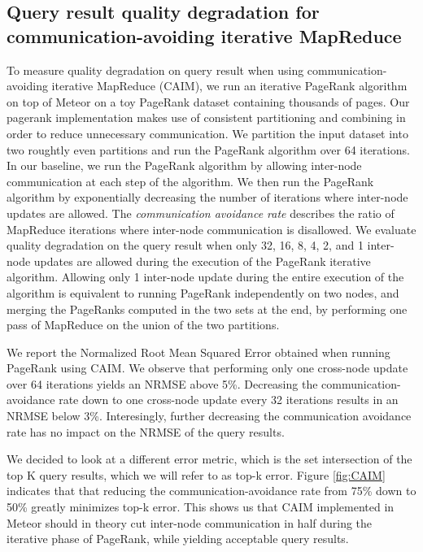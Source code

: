 \subsection{Query result quality degradation for communication-avoiding iterative MapReduce}

To measure quality degradation on query result when using communication-avoiding iterative MapReduce (CAIM), we run an iterative PageRank algorithm on top of Meteor on a toy PageRank dataset containing thousands of pages. Our pagerank implementation makes use of consistent partitioning and combining in order to reduce unnecessary communication. We partition the input dataset into two roughtly even partitions and run the PageRank algorithm over 64 iterations. In our baseline, we run the PageRank algorithm by allowing inter-node communication at each step of the algorithm. We then run the PageRank algorithm by exponentially decreasing the number of iterations where inter-node updates are allowed. The \emph{communication avoidance rate} describes the ratio of MapReduce iterations where inter-node communication is disallowed. We evaluate quality degradation on the query result when only 32, 16, 8, 4, 2, and 1 inter-node updates are allowed during the execution of the PageRank iterative algorithm. Allowing only 1 inter-node update during the entire execution of the algorithm is equivalent to running PageRank independently on two nodes, and merging the PageRanks computed in the two sets at the end, by performing one pass of MapReduce on the union of the two partitions. 

We report the Normalized Root Mean Squared Error obtained when running PageRank using CAIM. We observe that performing only one cross-node update over 64 iterations yields an NRMSE above 5\%. Decreasing the communication-avoidance rate down to one cross-node update every 32 iterations results in an NRMSE below 3\%. Interesingly, further decreasing the communication avoidance rate has no impact on the NRMSE of the query results. 

We decided to look at a different error metric, which is the set intersection of the top K query results, which we will refer to as top-k error. Figure \ref{fig:CAIM} indicates that that reducing the communication-avoidance rate from 75\% down to 50\% greatly minimizes top-k error. This shows us that CAIM implemented in Meteor should in theory cut inter-node communication in half during the iterative phase of PageRank, while yielding acceptable query results. 


